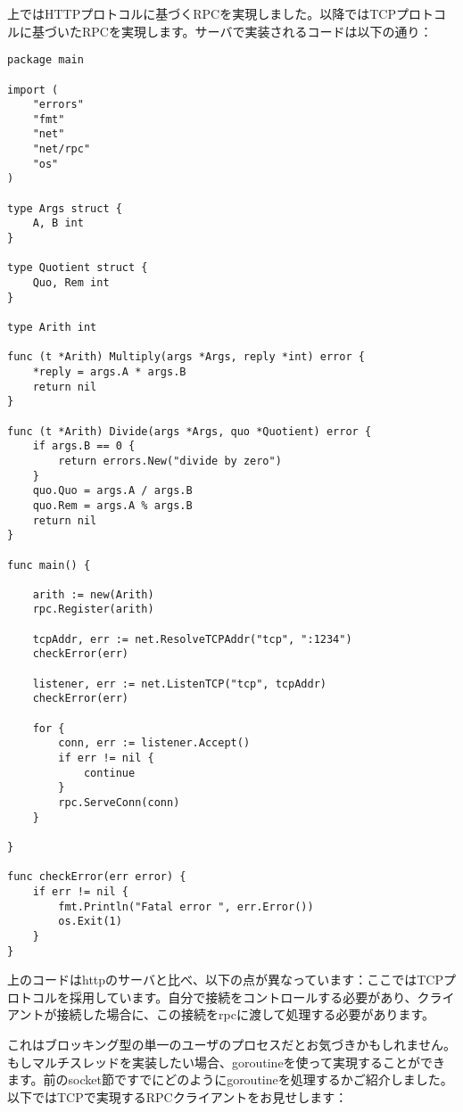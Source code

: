 上ではHTTPプロトコルに基づくRPCを実現しました。以降ではTCPプロトコルに基づいたRPCを実現します。サーバで実装されるコードは以下の通り：

\begin{lstlisting}[numbers=none]
package main

import (
    "errors"
    "fmt"
    "net"
    "net/rpc"
    "os"
)

type Args struct {
    A, B int
}

type Quotient struct {
    Quo, Rem int
}

type Arith int

func (t *Arith) Multiply(args *Args, reply *int) error {
    *reply = args.A * args.B
    return nil
}

func (t *Arith) Divide(args *Args, quo *Quotient) error {
    if args.B == 0 {
        return errors.New("divide by zero")
    }
    quo.Quo = args.A / args.B
    quo.Rem = args.A % args.B
    return nil
}

func main() {

    arith := new(Arith)
    rpc.Register(arith)

    tcpAddr, err := net.ResolveTCPAddr("tcp", ":1234")
    checkError(err)

    listener, err := net.ListenTCP("tcp", tcpAddr)
    checkError(err)

    for {
        conn, err := listener.Accept()
        if err != nil {
            continue
        }
        rpc.ServeConn(conn)
    }

}

func checkError(err error) {
    if err != nil {
        fmt.Println("Fatal error ", err.Error())
        os.Exit(1)
    }
}
\end{lstlisting}

上のコードはhttpのサーバと比べ、以下の点が異なっています：ここではTCPプロトコルを採用しています。自分で接続をコントロールする必要があり、クライアントが接続した場合に、この接続をrpcに渡して処理する必要があります。

これはブロッキング型の単一のユーザのプロセスだとお気づきかもしれません。もしマルチスレッドを実装したい場合、goroutineを使って実現することができます。前のsocket節ですでにどのようにgoroutineを処理するかご紹介しました。 以下ではTCPで実現するRPCクライアントをお見せします：

